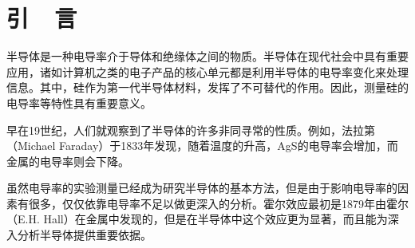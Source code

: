 \documentclass{buaaemp}
\begin{document}



\wuhao 

\section{引~~言}
半导体是一种电导率介于导体和绝缘体之间的物质。半导体在现代社会中具有重要应用，诸如计算机之类的电子产品的核心单元都是利用半导体的电导率变化来处理信息。其中，硅作为第一代半导体材料，发挥了不可替代的作用。因此，测量硅的电导率等特性具有重要意义。
	
早在19世纪，人们就观察到了半导体的许多非同寻常的性质。例如，法拉第（Michael Faraday）于1833年发现，随着温度的升高，AgS的电导率会增加\cite{laeri2006host}，而金属的电导率则会下降。
	
	
虽然电导率的实验测量已经成为研究半导体的基本方法，但是由于影响电导率的因素有很多，仅仅依靠电导率不足以做更深入的分析。霍尔效应最初是1879年由霍尔（E.H. Hall）在金属中发现的，但是在半导体中这个效应更为显著，而且能为深入分析半导体提供重要依据\cite{solidstatephysics}。
	
\end{document}
